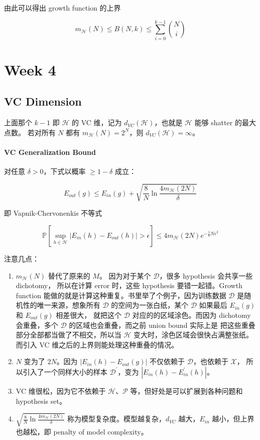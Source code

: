 \documentclass[a4paper]{article}
\begin{document}
由此可以得出 growth function 的上界

$$m_{\mathcal{H}}(N) \le B(N, k) \le \sum_{i=0}^{k-1}\binom{N}{i}$$



\section{Week 4}

\subsection{VC Dimension}
上面那个 $k-1$ 即 $\mathcal{H}$ 的 VC 维，记为 $d_{VC}(\mathcal{H})$，也就是 $\mathcal{H}$ 能够 shatter 的最大点数。
若对所有 $N$ 都有 $m_{\mathcal{H}}(N) = 2^N$，则 $d_{VC}(\mathcal{H}) = \infty$。

\paragraph{VC Generalization Bound}
对任意 $\delta > 0$，下式以概率 $\ge 1 - \delta$ 成立：

$$E_{out}(g) \le E_{in}(g) + \sqrt{\frac{8}{N}\ln{\frac{4m_{\mathcal{H}}(2N)}{\delta}}}$$

即 Vapnik-Chervonenkis 不等式

$$\mathbb{P} \left [ \sup_{h \in \mathcal{H}}|E_{in}(h) - E_{out}(h)| > \epsilon \right ] \le 4m_{\mathcal{H}}(2N)e^{-\frac{1}{8}N\epsilon^2}$$

注意几点：
\begin{enumerate}
  \item $m_{\mathcal{H}}(N)$ 替代了原来的 $M$。 因为对于某个 $\mathcal{D}$，很多 hypothesis 会共享一些 dichotomy，
  所以在计算 error 时，这些 hypothesis 要错一起错。Growth function 能做的就是计算这种重复。书里举了个例子，因为训练数据 $\mathcal{D}$
  是随机性的唯一来源，想象所有 $\mathcal{D}$ 的空间为一张白纸，某个 $\mathcal{D}$ 如果最后 $E_{in}(g)$ 和 $E_{out}(g)$ 相差很大，
  就把这个 $\mathcal{D}$ 对应的的区域涂色。而因为 dichotomy 会重叠，多个 $\mathcal{D}$ 的区域也会重叠，而之前 union bound 实际上是
  把这些重叠部分全部都当做了不相交，所以当 $\mathcal{H}$ 变大时，涂色区域会很快占满整张纸。而引入 VC 维之后的上界则能处理这种重叠的情况。
  \item $N$ 变为了 $2N$。因为 $|E_{in}(h) - E_{out}(g)|$ 不仅依赖于 $\mathcal{D}$，也依赖于 $\mathcal{X}$，
  所以引入了一个同样大小的样本 $\mathcal{D}^{\prime}$，变为 $|E_{in}(h) - E_{in}^{\prime}(h)|$。
  \item VC 维很松，因为它不依赖于 $\mathcal{H}$、$\mathcal{P}$ 等，但好处是可以扩展到各种问题和 hypothesis set。
  \item $\sqrt{\frac{8}{N}\ln{\frac{4m_{\mathcal{H}}(2N)}{\delta}}}$ 称为模型复杂度。模型越复杂，$d_{VC}$ 越大，$E_{in}$ 越小，但上界也越松，即 penalty of model complexity。
\end{enumerate}
\end{document}

